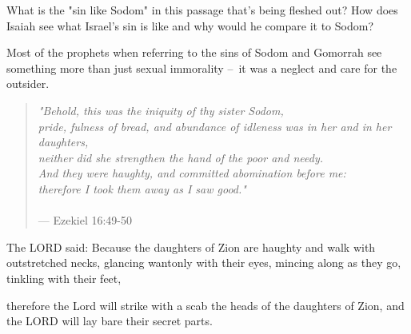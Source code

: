\documentclass[11pt]{article}
\begin{document}
What is the "sin like Sodom" in this passage that's being fleshed out? How does Isaiah see what Israel's sin is like
and why would he compare it to Sodom?

{\vspace{1em}}
Most of the prophets when referring to the sins of Sodom and Gomorrah see something
more than just sexual immorality – it was a neglect and care for the outsider.

\begin{quote}
\textit{"Behold, this was the iniquity of thy sister Sodom,\\
pride, fulness of bread, and abundance of idleness was in her and in her daughters,\\
neither did she strengthen the hand of the poor and needy.\\
And they were haughty, and committed abomination before me:\\
therefore I took them away as I saw good."}\\\\
\hfill --- Ezekiel 16:49-50
\end{quote}

{\vspace{1em}}

\begin{biblicaloutline}[Isaiah 3:16-17]


\begin{versesection}{2em}
 The LORD said:
Because the daughters of Zion are haughty
\poetryline and walk with outstretched necks,
\poetryline glancing wantonly with their eyes,
mincing along as they go,
\poetryline tinkling with their feet,

 therefore the Lord will strike with a scab
\poetryline the heads of the daughters of Zion,
\poetryline and the LORD will lay bare their secret parts.
\end{versesection}

\end{biblicaloutline}
\end{document}
